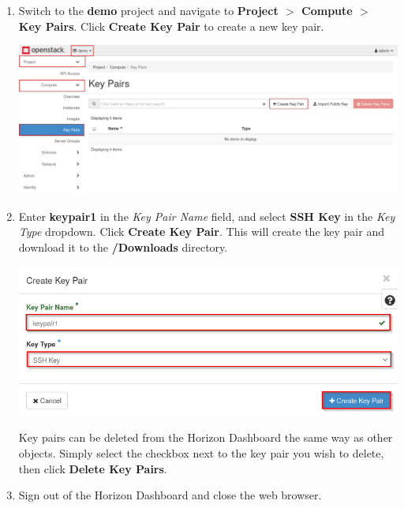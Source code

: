 \documentclass[letterpaper, 12pt]{article}
\begin{document}
\begin{enumerate}
    \item Switch to the \textbf{demo} project and navigate to \textbf{Project $>$ Compute $>$ Key Pairs}. Click
    \textbf{Create Key Pair} to create a new key pair.

    \begin{center}
        \includegraphics[width=\linewidth]{images/part4/step2.png}
    \end{center}

    \item Enter \textbf{keypair1} in the \textit{Key Pair Name} field, and select \textbf{SSH Key} in the \textit{Key
    Type} dropdown. Click \textbf{Create Key Pair}. This will create the key pair and download it to the
    \textbf{\texttildemid/Downloads} directory.

    \begin{center}
        \includegraphics[width=\linewidth]{images/part4/step3.png}
    \end{center}

    \begin{tipbox}
        Key pairs can be deleted from the Horizon Dashboard the same way as other objects. Simply select the checkbox
        next to the key pair you wish to delete, then click \textbf{Delete Key Pairs}.
    \end{tipbox}

    \item Sign out of the Horizon Dashboard and close the web browser.
    

\end{enumerate}
\end{document}
